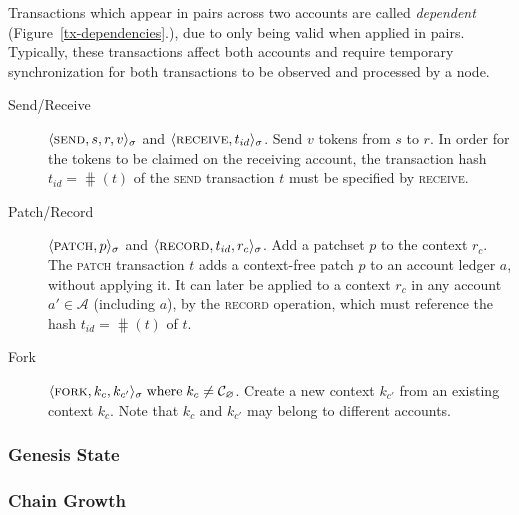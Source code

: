 Transactions which appear in pairs across two accounts are called
\emph{dependent} (Figure~\ref{tx-dependencies}.), due to only being valid when
applied in pairs. Typically, these transactions affect both accounts and
require temporary synchronization for both transactions to be observed and
processed by a node.

\begin{fig}
    \centering
    
\end{fig}

\begin{description}
    \item[Send/Receive] $\langle \text{\normalfont\scshape send}, s, r, v \rangle_{\sigma}$ and
        $\langle \text{\normalfont\scshape receive}, t_{id} \rangle_{\sigma}$. Send $v$ tokens from $s$ to $r$. In
        order for the tokens to be claimed on the receiving account, the
        transaction hash $t_{id} = \hash(t)$ of the \textsc{send} transaction
        $t$ must be specified by \textsc{receive}.
    \item[Patch/Record] $\langle \text{\normalfont\scshape patch}, p \rangle_\sigma$ and $\langle \text{\normalfont\scshape record}, t_{id},
        r_c \rangle_{\sigma}$.  Add a patchset $p$ to the context $r_c$. The
        \textsc{patch} transaction $t$ adds a context-free patch $p$ to an
        account ledger $a$, without applying it. It can later be applied to a
        context $r_c$ in any account $a' \in \mathcal{A}$ (including $a$), by
        the \textsc{record} operation, which must reference the hash $t_{id} =
        \hash(t)$ of $t$.
    \item[Fork] $\langle \text{\normalfont\scshape fork}, k_c, k_{c'} \rangle_\sigma \; \text{where} \; k_c \neq
        \mathcal{C}_{\varnothing}$. Create a new context $k_{c'}$ from an
        existing context $k_c$. Note that $k_c$ and $k_{c'}$ may belong to
        different accounts.
\end{description}

\subsubsection{Genesis State}
\subsubsection{Chain Growth}

